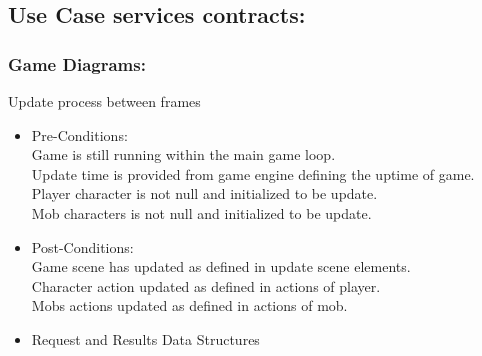 \documentclass[letterpaper]{article}
\begin{document}
			\vspace{0.2in}
			\subsection*{Use Case services contracts:}
			\vspace{0.1in}
				
				\subsubsection*{Game Diagrams:}
				\vspace{0.1in}
					
					\hspace{5mm}Update process between frames
					\begin{itemize}
						\item Pre-Conditions: \\
							Game is still running within the main game loop. \\
							Update time is provided from game engine defining the uptime of game. \\
							Player character is not null and initialized to be update. \\
							Mob characters is not null and initialized to be update.
						\item Post-Conditions: \\
							Game scene has updated as defined in update scene elements. \\
							Character action updated as defined in actions of player. \\
							Mobs actions updated as defined in actions of mob.
						\item Request and Results Data Structures \\
							
					\end{itemize}
					
\end{document}
